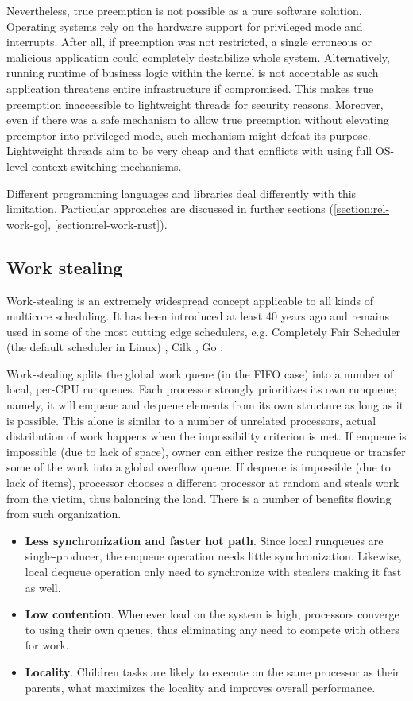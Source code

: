 \documentclass[12pt,a4paper,twoside]{report}
\begin{document}
Nevertheless, true preemption is not possible as a pure software solution. Operating systems rely on the hardware support for privileged mode and interrupts. After all, if preemption was not restricted, a single erroneous or malicious application could completely destabilize whole system. Alternatively, running runtime of business logic within the kernel is not acceptable as such application threatens entire infrastructure if compromised. This makes true preemption inaccessible to lightweight threads for security reasons. Moreover, even if there was a safe mechanism to allow true preemption without elevating preemptor into privileged mode, such mechanism might defeat its purpose. Lightweight threads aim to be very cheap and that conflicts with using full OS-level context-switching mechanisms.

Different programming languages and libraries deal differently with this limitation. Particular approaches are discussed in further sections (\ref{section:rel-work-go}, \ref{section:rel-work-rust}).


\subsection{Work stealing}
\label{section:background-work-stealing}
Work-stealing is an extremely widespread concept applicable to all kinds of multicore scheduling. It has been introduced at least 40 years ago \cite{Blumofe1999} and remains used in some of the most cutting edge schedulers, e.g. Completely Fair Scheduler (the default scheduler in Linux) \cite{linux_cfs}, Cilk \cite{Blumofe1995}, Go \cite{golang}.

Work-stealing splits the global work queue (in the FIFO case) into a number of local, per-CPU runqueues. Each processor strongly prioritizes its own runqueue; namely, it will enqueue and dequeue elements from its own structure as long as it is possible. This alone is similar to a number of unrelated processors, actual distribution of work happens when the impossibility criterion is met. If enqueue is impossible (due to lack of space), owner can either resize the runqueue or transfer some of the work into a global overflow queue. If dequeue is impossible (due to lack of items), processor chooses a different processor at random and steals work from the victim, thus balancing the load. There is a number of benefits flowing from such organization. \begin{itemize}
    \item \textbf{Less synchronization and faster hot path}. Since local runqueues are single-producer, the enqueue operation needs little synchronization. Likewise, local dequeue operation only need to synchronize with stealers making it fast as well. 
    \item \textbf{Low contention}. Whenever load on the system is high, processors converge to using their own queues, thus eliminating any need to compete with others for work.
    \item \textbf{Locality}. Children tasks are likely to execute on the same processor as their parents, what maximizes the locality and improves overall performance.
\end{itemize}
\end{document}
